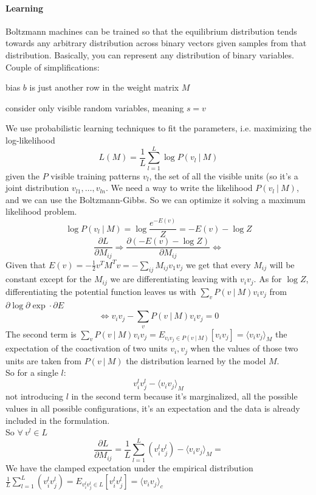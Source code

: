 \documentclass[10pt]{report}
\begin{document}
\paragraph{Learning} Boltzmann machines can be trained so that the equilibrium distribution tends towards any arbitrary distribution across binary vectors given samples from that distribution. Basically, you can represent any distribution of binary variables.\\
Couple of simplifications:
\begin{list}{}{}
	\item bias $b$ is just another row in the weight matrix $M$
	\item consider only visible random variables, meaning $s = v$
\end{list}
We use probabilistic learning techniques to fit the parameters, i.e. maximizing the log-likelihood $$L(M)=\frac{1}{L}\sum_{l=1}^L \log P(v_l\:|\:M)$$
given the $P$ visible training patterns $v_l$, the set of all the visible units (so it's a joint distribution $v_{l1},\ldots,v_{ln}$. We need a way to write the likelihood $P(v_l\:|\:M)$, and we can use the Boltzmann-Gibbs. So we can optimize it solving a maximum likelihood problem.
$$\log P(v_l\:|\:M) = \log \frac{e^{-E(v)}}{Z} = -E(v) - \log Z$$
$$\frac{\partial L}{\partial M_{ij}} \Rightarrow \frac{\partial (-E(v) - \log Z)}{\partial M_{ij}}\Leftrightarrow$$
Given that $E(v) = -\frac{1}{2}v^TM^Tv = -\sum_{ij} M_{ij} v_1v_j$ we get that every $M_{ij}$ will be constant except for the $M_{ij}$ we are differentiating leaving with $v_iv_j$. As for $\log Z$, differentiating the potential function leaves us with $\sum_v P(v\:|\:M)v_iv_j$ from $\partial\log\partial\exp\cdot\partial E$
$$\Leftrightarrow v_iv_j - \sum_v P(v\:|\:M)v_iv_j = 0$$
The second term is $\sum_v P(v\:|\:M)v_iv_j = E_{v_iv_j\in P(v\:|\:M)}[v_iv_j] = \langle v_iv_j\rangle_M$ the expectation of the coactivation of two units $v_i,v_j$ when the values of those two units are taken from $P(v\:|\:M)$ the distribution learned by the model $M$.\\
So for a single $l$:
$$v_i^lv_j^l - \langle v_iv_j\rangle_M$$
not introducing $l$ in the second term because it's marginalized, all the possible values in all possible configurations, it's an expectation and the data is already included in the formulation.\\
So $\forall\:v^l\in L$ $$\frac{\partial L}{\partial M_{ij}} = \frac{1}{L}\sum_{l=1}^L (v_i^lv_j^l)-\langle v_iv_j\rangle_M=$$
We have the clamped expectation under the empirical distribution $\frac{1}{L}\sum_{l=1}^L (v_i^lv_j^l) = E_{v_i^lv_j^l\in L}[v_i^lv_j^l] = \langle v_iv_j\rangle_c$
\end{document}
